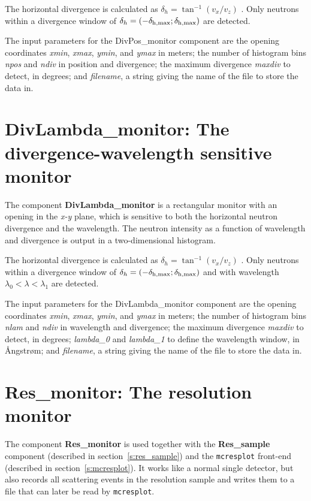 The horizontal divergence is calculated as $\delta_h = \tan^{-1}(v_x/v_z)$ .
Only neutrons within a divergence window of 
$\delta_h = (-\delta_{\rm h,max} ; \delta_{\rm h,max})$ are detected.

The input parameters for the DivPos\_monitor component are the opening coordinates
\textit{xmin}, \textit{xmax}, \textit{ymin}, and
\textit{ymax} in meters;
the number of histogram bins \textit{npos} and \textit{ndiv} in
position and divergence; the maximum divergence \textit{maxdiv} to
detect, in degrees; and \textit{filename}, a
string giving the name of the file to store the data in.


\section{DivLambda\_monitor: The divergence-wavelength sensitive monitor}

The component {\bf DivLambda\_monitor} is a rectangular monitor
with an opening in the \textit{x-y} plane,
which is sensitive to both the horizontal neutron divergence and the
wavelength. The neutron intensity as a function of wavelength and
divergence is output in a two-dimensional histogram.
 
The horizontal divergence is calculated as $\delta_h = \tan^{-1}(v_x/v_z)$ .
Only neutrons within a divergence window of 
$\delta_h = (-\delta_{\rm h,max} ; \delta_{\rm h,max})$ and with
wavelength $\lambda_0 < \lambda < \lambda_1$ are detected.

The input parameters for the DivLambda\_monitor component are the opening coordinates
\textit{xmin}, \textit{xmax}, \textit{ymin}, and
\textit{ymax} in meters;
the number of histogram bins \textit{nlam} and \textit{ndiv} in
wavelength and divergence; the maximum divergence \textit{maxdiv} to
detect, in degrees; \textit{lambda\_0} and \textit{lambda\_1} to define
the wavelength window, in {\AA}ngstr{\o}m; and \textit{filename}, a
string giving the name of the file to store the data in.





\section{Res\_monitor: The resolution monitor}
\label{s:res_monitor}
The component \textbf{Res\_monitor} is used together with the
\textbf{Res\_sample} component (described in section~\ref{s:res_sample})
and the \verb+mcresplot+ front-end (described in
section~\ref{s:mcresplot}). It works like a normal single detector, but
also records all scattering events in the resolution sample and writes
them to a file that can later be read by \verb+mcresplot+.

